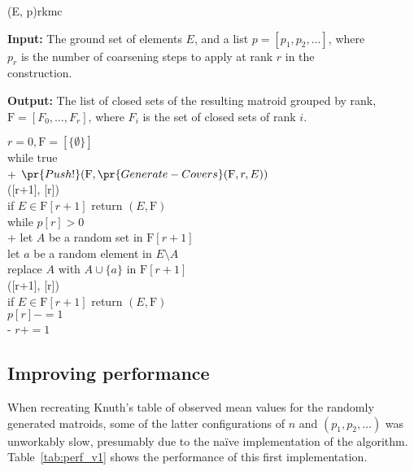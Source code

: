 \begin{algorithm}[float*=ht!]{(E, p)}{rkmc}

  \textbf{Input:}     \tab The ground set of elements $E$, and a list $p = [p_1, p_2, ...]$, where \\
  \mbox{}\tab $p_r$ is the number of coarsening steps to apply at rank $r$ in the \\
  \mbox{}\tab construction.

  \textbf{Output:}    \tab The list of closed sets of the resulting matroid grouped by rank, \\
  \mbox{}\tab $\mathrm{F} = [F_0, \ldots, F_r]$, where $F_i$ is the set of closed sets of rank $i$.

  \begin{pseudo}[label=\small\arabic*, indent-mark, line-height=1.2]
    $r = 0, \mathrm{F} = [\{ \emptyset \}]$ \\
    while true  \\+
      $\pr{Push!}(\mathrm{F}, \pr{Generate-Covers}(\mathrm{F}, r, E))$ \\
      ([r+1], [r]) \\
      
      if $E \in \mathrm{F}[r+1]$ return $(E, \mathrm{F})$ \\
      
      while $p[r] > 0$ \\+
        let $A$ be a random set in $\mathrm{F}[r+1]$ \\
        let $a$ be a random element in $E \setminus A$ \\
        replace $A$ with $A \cup \{a\}$ in $\mathrm{F}[r+1]$ \\
        ([r+1], [r]) \\

        if $E \in \mathrm{F}[r+1]$ return $(E, \mathrm{F})$ \\

        $p[r] -= 1$ \\-
      $r += 1$

  \end{pseudo}

\end{algorithm}


\subsection{Improving performance}
\label{sec:improving-performance}
When recreating Knuth's table of observed mean values for the randomly generated matroids, some of the latter configurations of $n$ and $(p_1, p_2, \ldots)$ was unworkably slow, presumably due to the naïve implementation of the algorithm. Table~\ref{tab:perf_v1} shows the performance of this first implementation.

